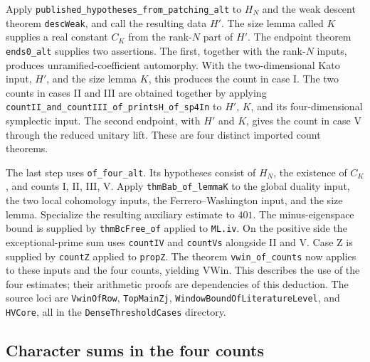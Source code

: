 Apply \texttt{published\_\allowbreak{}hypotheses\_\allowbreak{}from\_\allowbreak{}patching\_\allowbreak{}alt} to \(H_N\) and the
weak descent theorem \texttt{desc\allowbreak{}Weak}, and call the resulting data \(H'\).
The size lemma called \(K\) supplies a real constant \(C_K\) from the
rank-\(N\) part of \(H'\). The endpoint theorem
\texttt{ends0\_\allowbreak{}alt} supplies two assertions. The first, together with
the rank-\(N\) inputs, produces unramified-coefficient automorphy. With
the two-dimensional Kato input, \(H'\), and the size lemma \(K\), this
produces the count in case I. The two counts in cases II and III are
obtained together by applying
\texttt{count\allowbreak{}II\_\allowbreak{}and\_\allowbreak{}count\allowbreak{}III\_\allowbreak{}of\_\allowbreak{}prints\allowbreak{}H\_\allowbreak{}of\_\allowbreak{}sp4\allowbreak{}In}
to \(H'\), \(K\), and its four-dimensional symplectic input. The second
endpoint, with \(H'\) and \(K\), gives the count in case V through the
reduced unitary lift. These are four distinct imported count theorems.

The last step uses \texttt{of\_\allowbreak{}four\_\allowbreak{}alt}. Its hypotheses consist of
\(H_N\), the existence of \(C_K\), and counts I, II, III, V. Apply
\texttt{thm\allowbreak{}Bab\_\allowbreak{}of\_\allowbreak{}lemma\allowbreak{}K} to the global duality input, the two local
cohomology inputs, the Ferrero--Washington input, and the size lemma.
Specialize the resulting auxiliary estimate to \(401\). The minus-eigenspace bound is supplied by \texttt{thm\allowbreak{}Bc\allowbreak{}Free\_\allowbreak{}of} applied to \texttt{ML.\allowbreak{}iv}. On the positive side the exceptional-prime sum uses \texttt{count\allowbreak{}IV} and \texttt{count\allowbreak{}Vs} alongside II and V. Case Z is supplied by \texttt{count\allowbreak{}Z} applied to \texttt{prop\allowbreak{}Z}. The theorem \texttt{vwin\_\allowbreak{}of\_\allowbreak{}counts} now applies to these
inputs and the four counts, yielding \(\mathrm{VWin}\). This describes the
use of the four estimates; their arithmetic proofs are dependencies of this
deduction. The source loci are \texttt{Vwin\allowbreak{}Of\allowbreak{}Row},
\texttt{Top\allowbreak{}Main\allowbreak{}Zj}, \texttt{Window\allowbreak{}Bound\allowbreak{}Of\allowbreak{}Literature\allowbreak{}Level}, and
\texttt{HVCore}, all in the \texttt{Dense\allowbreak{}Threshold\allowbreak{}Cases} directory.

\subsection{Character sums in the four counts}

